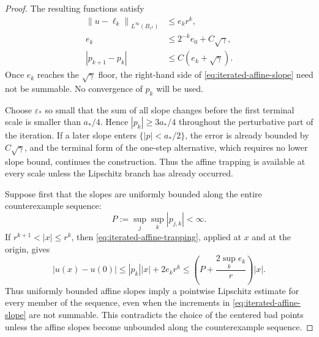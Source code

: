 \documentclass[11pt,letterpaper]{amsart}
\numberwithin{equation}{section}
\newcommand{\norm}[1]{\left\lVert #1\right\rVert}
\theoremstyle{definition}
\theoremstyle{remark}
\begin{document}
\begin{proof}
The resulting functions satisfy
\begin{align}
\norm{u-\ell_k}_{L^\infty(B_{r^k})}
&\leq e_kr^k,
\label{eq:iterated-affine-trapping}
\\
e_k
&\leq2^{-k}e_0+C\sqrt\gamma,
\label{eq:iterated-affine-error}
\\
|p_{k+1}-p_k|
&\leq C(e_k+\sqrt\gamma).
\label{eq:iterated-affine-slope}
\end{align}
Once $e_k$ reaches the $\sqrt\gamma$ floor, the right-hand side of
\eqref{eq:iterated-affine-slope} need not be summable. No convergence of
$p_k$ will be used.

Choose $\varepsilon_*$ so small that the sum of all slope changes before
the first terminal scale is smaller than $a_*/4$. Hence
$|p_k|\geq3a_*/4$ throughout the perturbative part of the iteration. If a
later slope enters $\{|p|<a_*/2\}$, the error is already bounded by
$C\sqrt\gamma$, and the terminal form of the one-step alternative, which
requires no lower slope bound, continues the construction. Thus the affine
trapping is available at every scale unless the Lipschitz branch has already
occurred.

Suppose first that the slopes are uniformly bounded along the entire
counterexample sequence:
$$
P:=\sup_j\sup_k|p_{j,k}|<\infty.
$$
If $r^{k+1}<|x|\leq r^k$, then
\eqref{eq:iterated-affine-trapping}, applied at $x$ and at the origin,
gives
$$
|u(x)-u(0)|
\leq
|p_k||x|+2e_kr^k
\leq
\left(P+\frac{2\sup_ke_k}{r}\right)|x|.
$$
Thus uniformly bounded affine slopes imply a pointwise Lipschitz estimate
for every member of the sequence, even when
the increments in \eqref{eq:iterated-affine-slope} are not summable.
This contradicts the choice of the centered bad points unless the affine
slopes become unbounded along the counterexample sequence.


\end{proof}
\end{document}
